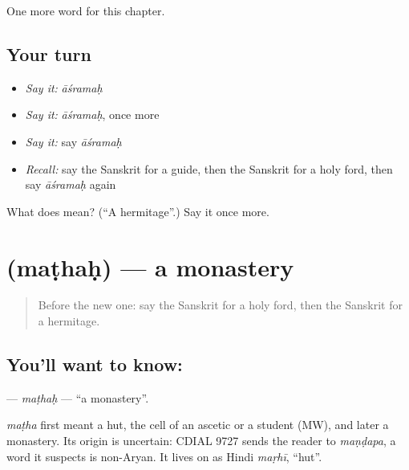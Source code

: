 \begin{grammarlens}[title={What you've built}]
One more word for this chapter.
\end{grammarlens}

\subsection*{Your turn}
\begin{itemize}
\raggedright
  \item \emph{Say it:} \emph{āśramaḥ}
  \item \emph{Say it:} \emph{āśramaḥ}, once more
  \item \emph{Say it:} say \emph{āśramaḥ}
  \item \emph{Recall:} say the Sanskrit for a guide, then the Sanskrit for a holy ford, then say \emph{āśramaḥ} again
\end{itemize}

\begin{tcolorbox}[breakable,colback=teal!4,colframe=teal!35!black,title={Before you move on}]
What does  mean? (\textquotedblleft{}A hermitage\textquotedblright{}.) Say it once more.
\end{tcolorbox}
\section[\texorpdfstring{\sk{मठः} (maṭhaḥ)}{मठः (maṭhaḥ)}]{ (maṭhaḥ) — a monastery}

\label{lesson:SA-C223-mathah}



\begin{quote}
Before the new one: say the Sanskrit for a holy ford, then the Sanskrit for a hermitage.
\end{quote}

\subsection*{You'll want to know: }
\textbf{} — \emph{maṭhaḥ} — \textquotedblleft{}a monastery\textquotedblright{}.

\begin{cousinweb}
\emph{maṭha} first meant a hut, the cell of an ascetic or a student (MW), and later a monastery. Its origin is uncertain: CDIAL 9727 sends the reader to \emph{maṇḍapa}, a word it suspects is non-Aryan. It lives on as Hindi \emph{maṛhī}, \textquotedblleft{}hut\textquotedblright{}.
\end{cousinweb}

